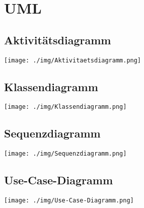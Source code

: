 \chapter{UML}


\section{Aktivitätsdiagramm}
\begin{minipage}{\linewidth}
\centering%
\texttt{[image: ./img/Aktivitaetsdiagramm.png]}%
%
\label{fig:Aktivitätsdiagramm}%
\end{minipage}
\vspace{10px}


\section{Klassendiagramm}
\begin{minipage}{\linewidth}
\centering%
\texttt{[image: ./img/Klassendiagramm.png]}%
%
\label{fig:Klassendiagramm}%
\end{minipage}
\vspace{10px}


\section{Sequenzdiagramm}
\begin{minipage}{\linewidth}
\centering%
\texttt{[image: ./img/Sequenzdiagramm.png]}%
%
\label{fig:Sequenzdiagramm}%
\end{minipage} 
\vspace{10px}




\section{Use-Case-Diagramm}
\begin{minipage}{\linewidth}
\centering%
\texttt{[image: ./img/Use-Case-Diagramm.png]}%
\centering
{}%
\label{fig:Use-Case-Diagramm}%
\end{minipage}
\vspace{10px}
